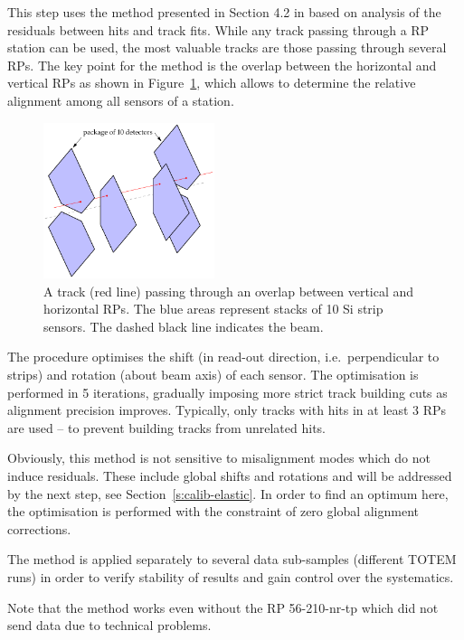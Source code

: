 \documentclass[TOTEM]{cern/cernphprep}
\begin{document}
This step uses the method presented in Section 4.2 in \cite{jan_thesis} based on analysis of the residuals between hits and track fits. While any track passing through a RP station can be used, the most valuable tracks are those passing through several RPs. The key point for the method is the overlap between the horizontal and vertical RPs as shown in Figure~\ref{fig:rp_overlap}, which allows to determine the relative alignment among all sensors of a station.

\begin{figure}[h!]
\begin{center}
\includegraphics[width=5cm]{fig/rp_overlap.pdf}
\caption{%
A track (red line) passing through an overlap between vertical and horizontal RPs. The blue areas represent stacks of 10 Si strip sensors. The dashed black line indicates the beam.
}
\label{fig:rp_overlap}
\end{center}
\end{figure}

The procedure optimises the shift (in read-out direction, i.e.~perpendicular to strips) and rotation (about beam axis) of each sensor. The optimisation is performed in 5 iterations, gradually imposing more strict track building cuts as alignment precision improves. Typically, only tracks with hits in at least 3 RPs are used -- to prevent building tracks from unrelated hits.

Obviously, this method is not sensitive to misalignment modes which do not induce residuals. These include global shifts and rotations and will be addressed by the next step, see Section~\ref{s:calib-elastic}. In order to find an optimum here, the optimisation is performed with the constraint of zero global alignment corrections.

The method is applied separately to several data sub-samples (different TOTEM runs) in order to verify stability of results and gain control over the systematics.

Note that the method works even without the RP 56-210-nr-tp which did not send data due to technical problems.
\end{document}
